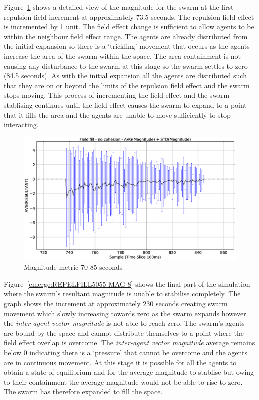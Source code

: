 Figure~\ref{emerge:REPELFILL5055-MAG-2-3} shows a detailed view of the magnitude for the swarm at the first repulsion field increment at approximately 73.5 seconds. The repulsion field effect is incremented by 1 unit. The field effect change is sufficient to allow agents to be within the neighbour field effect range. The agents are already distributed from the initial expansion so there is a `trickling' movement that occurs as the agents increase the area of the swarm within the space. The area containment is not causing any disturbance to the swarm at this stage so the swarm settles to zero (84.5 seconds). As with the initial expansion all the agents are distributed such that they are on or beyond the limits of the repulsion field effect and the swarm stops moving. This process of incrementing the field effect and the swarm stablising continues until the field effect causes the swarm to expand to a point that it fills the area and the agents are unable to move sufficiently to stop interacting.

\begin{figure}[H]
\begin{center}
\includegraphics[width=12cm]{CHAPTER-8/figures/REPELFILL5055-MAG-2-3}
\end{center}
\caption{Magnitude metric 70-85 seconds\label{emerge:REPELFILL5055-MAG-2-3}}
\end{figure}

Figure~\ref{emerge:REPELFILL5055-MAG-8} shows the final part of the simulation where the swarm's resultant magnitude is unable to stabilise completely. The graph shows the increment at approximately 230 seconds creating swarm movement which slowly increasing towards zero as the swarm expands however the \textit{inter-agent vector magnitude} is not able to reach zero. The swarm's agents are bound by the space and cannot distribute themselves to a point where the field effect overlap is overcome. The \textit{inter-agent vector magnitude} average remains below 0 indicating there is a `pressure' that cannot be overcome and the agents are in continuous movement. At this stage it is possible for all the agents to obtain a state of equilibrium and for the average magnitude to stablise but owing to their containment the average magnitude would not be able to rise to zero. The swarm has therefore expanded to fill the space.

